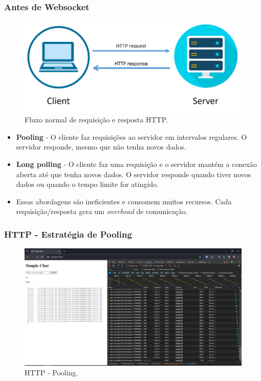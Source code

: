 \documentclass[
	10pt, %
	t, %
]{beamer}
\begin{document}
\begin{frame}
	\frametitle{Antes de Websocket}

	\begin{figure}
		\centering
		\includegraphics[width=0.5\linewidth]{http_padrao.png}
		\caption{Fluxo normal de requisição e resposta HTTP.}
		\label{fig:http_padrao}
	\end{figure}

	\begin{itemize}
		\item \textbf{Pooling} - O cliente faz requisições ao servidor em intervalos regulares. O servidor responde, mesmo que não tenha novos dados.
		\item \textbf{Long polling} - O cliente faz uma requisição e o servidor mantém a conexão aberta até que tenha novos dados. O servidor responde quando tiver novos dados ou quando o tempo limite for atingido.
		\item \alert{Essas abordagens são ineficientes e consomem muitos recursos. Cada requisição/resposta gera um \textit{overhead} de comunicação.}
	\end{itemize}

\end{frame}

\begin{frame}
	\frametitle{HTTP - Estratégia de Pooling}

	\begin{figure}
		\centering
		\includegraphics[width=0.9\linewidth]{pooling.png}
		\caption{HTTP - Pooling.}
		\label{fig:http_pooling}
	\end{figure}
	
\end{frame}
\end{document}
